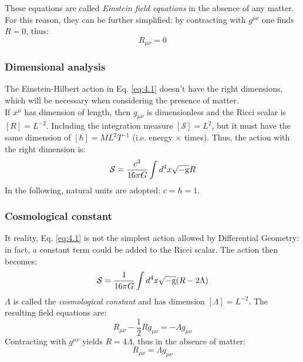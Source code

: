 These equations are called \textit{Einstein field equations} in the absence of any matter. For this reason, they can be further simplified: by contracting with $ g^{\mu \nu} $ one finds $ R = 0 $, thus:
\begin{equation}
  R_{\mu \nu} = 0
  \label{eq:4.6}
\end{equation}

\subsubsection{Dimensional analysis}

The Einstein-Hilbert action in Eq. \ref{eq:4.1} doesn't have the right dimensions, which will be necessary when considering the presence of matter.\\
If $ x^\mu $ has dimension of length, then $ g_{\mu \nu} $ is dimensionless and the Ricci scalar is $ [R] = L^{-2} $. Including the integration measure $ [\mathcal{S}] = L^2 $, but it must have the same dimension of $ [\hbar] =  M L^2 T^{-1} $ (i.e. energy $ \times $ times). Thus, the action with the right dimension is:
\begin{equation}
  \mathcal{S} = \frac{c^3}{16 \pi G} \int d^4 x \sqrt{-\mathrm{g}} R
  \label{eq:4.7}
\end{equation}
In the following, natural units are adopted: $ c = \hbar = 1 $.

\subsubsection{Cosmological constant}

It reality, Eq. \ref{eq:4.1} is not the simplest action allowed by Differential Geometry: in fact, a constant term could be added to the Ricci scalar. The action then becomes:
\begin{equation}
  \mathcal{S} = \frac{1}{16 \pi G} \int d^4 x \sqrt{-\mathrm{g}} (R - 2 \Lambda)
  \label{eq:4.8}
\end{equation}
$ \Lambda $ is called the \textit{cosmological constant} and has dimension $ [\Lambda] = L^{-2} $. The resulting field equations are:
\begin{equation}
  R_{\mu \nu} - \frac{1}{2} R g_{\mu \nu} = - \Lambda g_{\mu \nu}
  \label{eq:4.9}
\end{equation}
Contracting with $ g^{\mu \nu} $ yields $ R = 4\Lambda $, thus in the absence of matter:
\begin{equation}
  R_{\mu \nu} = \Lambda g_{\mu \nu}
  \label{eq:4.10}
\end{equation}

